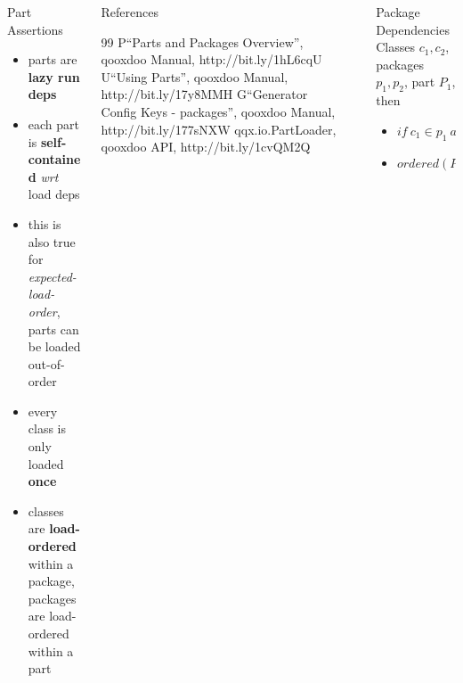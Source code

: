 \documentclass[final]{beamer}
\newlength{\sepwid}
\newlength{\onecolwid}
\newlength{\twocolwid}
\begin{document}
\begin{frame}[t]
\begin{columns}[t]
\begin{column}{\twocolwid}

    \begin{columns}[t,totalwidth=\twocolwid]
    \begin{column}{\onecolwid}
      \begin{block}{Part Assertions}
        \begin{itemize}
          \item parts are \textbf{lazy run deps}
          \item each part is \textbf{self-contained} \textit{wrt} load deps 
          \item this is also true for \textit{expected-load-order}, parts
            can be loaded out-of-order
          \item every class is only loaded \textbf{once}
          \item classes are \textbf{load-ordered} within a package, packages are
            load-ordered within a part
        \end{itemize}
      \end{block}

    \end{column}

    \begin{column}{\onecolwid}
      \begin{block}{References}
        \small{\begin{thebibliography}{99}
          \bibitem P``Parts and Packages Overview'', qooxdoo Manual, http://bit.ly/1hL6cqU
          \bibitem U``Using Parts'', qooxdoo Manual, http://bit.ly/17y8MMH
          \bibitem G``Generator Config Keys - packages'', qooxdoo Manual, http://bit.ly/177sNXW 
          \bibitem qqx.io.PartLoader, qooxdoo API, http://bit.ly/1cvQM2Q 
        \end{thebibliography}}
      \end{block}

    \end{column}

    \end{columns}
    \end{column}  %


    \begin{column}{\sepwid}\end{column}			%

    \begin{column}{\onecolwid}

      \begin{block}{Package Dependencies}
        Classes $c_1, c_2$, packages $p_1, p_2$, part $P_1$, then
        \begin{itemize}
          \item $if\ c_1 \in p_1\ and\ c_2 \in p_2\ and\ depends(c_1,c_2) \Rightarrow
            depends(p_1,p_2)$
          \item $ordered(P_1) \Leftrightarrow ordered(Packages(P_1))\ and\ 
            \forall P \in Packages(P_1): ordered(P)$
        \end{itemize}
      \end{block}


\end{column}
\end{columns}
\end{frame}
\end{document}
